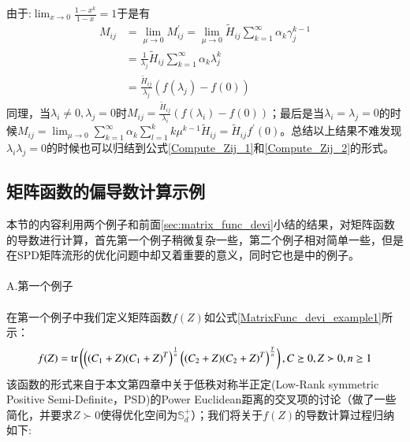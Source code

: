 由于:$\lim_{x\rightarrow 0}\frac{1-x^{k}}{1-x}=1$于是有
\begin{equation}
\label{ZerosEig_direction_gradient_M_1_1}
\begin{split}
M_{ij}&=\lim_{\mu \rightarrow 0} M_{ij}^{\prime}=\lim_{\mu \rightarrow 0} \tilde{H}_{ij}\sum_{k=1}^{\infty}\alpha_{k}\gamma_{j}^{k-1}\\
&=\frac{1}{\lambda_{j}}\tilde{H}_{ij}\sum_{k=1}^{\infty}\alpha_{k}\lambda_{j}^{k}\\
&=\frac{\tilde{H}_{ij}}{\lambda_{j}}(f(\lambda_{j})-f(0))
\end{split}
\end{equation}
同理，当$\lambda_i \neq 0,\lambda_j =0$时$M_{ij}=\frac{\tilde{H}_{ij}}{\lambda_{i}}(f(\lambda_{i})-f(0))$；最后是当$\lambda_i=\lambda_j=0$的时候$M_{ij}=\lim_{\mu \rightarrow 0}\sum_{k=1}^{\infty} \alpha_{k}\sum_{l=1}^{k}k\mu^{k-1}\tilde{H}_{ij}=\tilde{H}_{ij}f^{\prime}(0)$。总结以上结果不难发现$\lambda_i \lambda_j=0$的时候也可以归结到公式\ref{Compute_Zij_1}和\ref{Compute_Zij_2}的形式。
\subsection{矩阵函数的偏导数计算示例}
\label{sec:matrix_func_devi_examples}
本节的内容利用两个例子和前面\ref{sec:matrix_func_devi}小结的结果，对矩阵函数的导数进行计算，首先第一个例子稍微复杂一些，第二个例子相对简单一些，但是在SPD矩阵流形的优化问题中却又着重要的意义，同时它也是\cite{Maniopt_DiscreteCurveFitting}中的例子。\\\\
{\heiti A.第一个例子}\\\\
在第一个例子中我们定义矩阵函数$f(Z)$如公式\ref{MatrixFunc_devi_example1}所示：
\begin{equation}
\label{MatrixFunc_devi_example1}
f(Z)={\rm tr}\left(\left((C_1+Z)(C_1+Z)^{T}\right)^{\frac{1}{n}}\left((C_2+Z)(C_2+Z)^{T}\right)^{\frac{T}{n}}\right),C\succeq 0,Z\succ 0,n\geq 1
\end{equation}
该函数的形式来自于本文第四章中关于低秩对称半正定(Low-Rank symmetric Positive Semi-Definite，PSD)的Power Euclidean距离的交叉项的讨论（做了一些简化，并要求$Z \succ 0$使得优化空间为$\mathbb{S}_{d}^{+}$）；我们将关于$f(Z)$的导数计算过程归纳如下:

